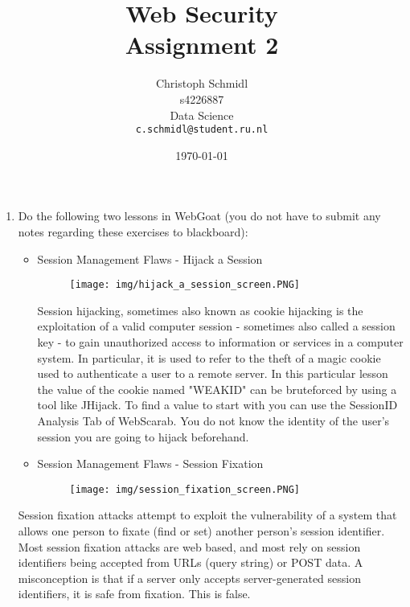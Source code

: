 \documentclass[a4paper]{article}
\title{Web Security\\Assignment 2}
\author{
  Christoph Schmidl\\ s4226887\\ Data Science\\      \texttt{c.schmidl@student.ru.nl}
}
\date{\today}
\begin{document}
\maketitle

\begin{enumerate}

\item Do the following two lessons in WebGoat (you do not have to submit any notes regarding these exercises to blackboard):

	\begin{itemize}
		\item Session Management Flaws - Hijack a Session
		
		\begin{figure}[H]
	    \centering
  	    \texttt{[image: img/hijack\_a\_session\_screen.PNG]}
	    \end{figure}	
	    
	    Session hijacking, sometimes also known as cookie hijacking is the exploitation of a valid computer session - sometimes also called a session key - to gain unauthorized access to information or services in a computer system. In particular, it is used to refer to the theft of a magic cookie used to authenticate a user to a remote server. In this particular lesson the value of the cookie named "WEAKID" can be bruteforced by using a tool like JHijack. To find a value to start with you can use the SessionID Analysis Tab of WebScarab. You do not know the identity of the user's session you are going to hijack beforehand.\\
	    
		\item Session Management Flaws - Session Fixation
		
		\begin{figure}[H]
	    \centering
  	    \texttt{[image: img/session\_fixation\_screen.PNG]}
	    \end{figure}	
	\end{itemize}

Session fixation attacks attempt to exploit the vulnerability of a system that allows one person to fixate (find or set) another person's session identifier. Most session fixation attacks are web based, and most rely on session identifiers being accepted from URLs (query string) or POST data. A misconception is that if a server only accepts server-generated session identifiers, it is safe from fixation. This is false.\\



\end{enumerate}
\end{document}
